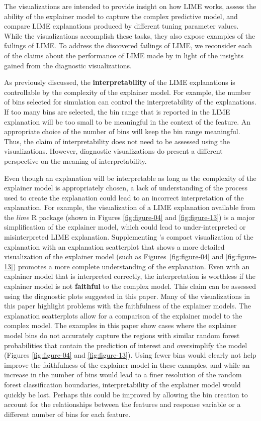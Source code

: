 \documentclass[AMS,STIX2COL]{WileyNJD-v2}\usepackage[]{graphicx}\usepackage[]{color}
\begin{document}
The visualizations are intended to provide insight on how LIME works, assess the ability of the explainer model to capture the complex predictive model, and compare LIME explanations produced by different tuning parameter values. While the visualizations accomplish these tasks, they also expose examples of the failings of LIME. To address the discovered failings of LIME, we reconsider each of the claims about the performance of LIME made by \citet{ribeiro:2016} in light of the insights gained from the diagnostic visualizations.

As previously discussed, the \textbf{interpretability} of the LIME explanations is controllable  by the complexity of the explainer model. For example, the number of bins selected for simulation can control the interpretability of the explanations. If too many bins are selected, the bin range that is reported in the LIME explanation will be too small to be meaningful in the context of the feature. An appropriate choice of the number of bins will keep the bin range meaningful. Thus, the claim of interpretability does not need to be assessed using the visualizations. However, diagnostic visualizations do present a different perspective on the meaning of interpretability.

Even though an explanation will be interpretable as long as the complexity of the explainer model is appropriately chosen, a lack of understanding of the process used to create the explanation could lead to an incorrect interpretation of the explanation. For example, the visualization of a LIME explanation available from the \emph{lime} R package \citep{pedersen:2020} (shown in Figures \ref{fig:figure-04} and \ref{fig:figure-13}) is a major simplification of the explainer model, which could lead to under-interpreted or misinterpreted LIME explanation. Supplementing \citet{pedersen:2020}'s compact visualization of the explanation with an explanation scatterplot that shows a more detailed visualization of the explainer model (such as Figures~\ref{fig:figure-04} and \ref{fig:figure-13}) promotes a more complete understanding of the explanation.
Even with an explainer model that is interpreted correctly, the interpretation is worthless if the explainer model is not \textbf{faithful} to the complex model. This claim can be assessed using the diagnostic plots suggested in this paper. Many of the visualizations in this paper highlight problems with the faithfulness of the explainer models. The explanation scatterplots allow for a comparison of the explainer model to the complex model. The examples in this paper show cases where the explainer model bins do not accurately capture the regions with similar random forest probabilities that contain the prediction of interest and oversimplify the model (Figures \ref{fig:figure-04} and \ref{fig:figure-13}). Using fewer bins would clearly not help improve the faithfulness of the explainer model in these examples, and while an increase in the number of bins would lead to a finer resolution of the random forest classification boundaries, interpretability of the explainer model would quickly be lost. Perhaps this could be improved by allowing the bin creation to account for the relationships between the features and response variable or a different number of bins for each feature.
\end{document}
